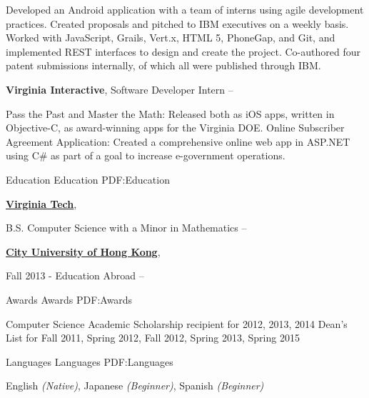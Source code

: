 \documentclass[letterpaper,MMMyyyy,nonstopmode]{simpleresumecv}
\begin{document}
\begin{Body}
\begin{large}
\Gap
\BulletItem
Developed an Android application with a team of interns using agile development practices.
\BulletItem
Created proposals and pitched to IBM executives on a weekly basis.
\BulletItem
Worked with JavaScript, Grails, Vert.x, HTML 5, PhoneGap, and Git, and implemented REST interfaces to design and create the project.
\BulletItem
Co-authored four patent submissions internally, of which all were published through IBM.
\end{large}

\BigGap
\Entry
\begin{large}
{\textbf{Virginia Interactive}},
Software Developer Intern
\hfill
{} --

\Gap
\BulletItem
Pass the Past and Master the Math: Released both as iOS apps, written in Objective-C, as award-winning apps for the Virginia DOE.
\BulletItem
Online Subscriber Agreement Application: Created a comprehensive online web app in ASP.NET using C# as part of a goal to increase e-government operations.
\end{large}


\BigGap
\Section
{Education}
{Education}
{PDF:Education}

\begin{large}
\Entry
\href{http://www.example.com/my-college}
{\textbf{Virginia Tech}},

\Gap
B.S. Computer Science with a Minor in Mathematics
\hfill
{} --

\BigGap
\Entry
\href{http://www.example.com/my-college}
{\textbf{City University of Hong Kong}},

\Gap
Fall 2013 - Education Abroad
\hfill
{} --
\end{large}


\BigGap
\Section
{Awards}
{Awards}
{PDF:Awards}

\begin{large}
Computer Science Academic Scholarship recipient for 2012, 2013, 2014
\Gap
Dean’s List for Fall 2011, Spring 2012, Fall 2012, Spring 2013, Spring 2015
\end{large}


\BigGap
\Section
{Languages}
{Languages}
{PDF:Languages}

\begin{large}
English
\textit{(Native)},
Japanese
\textit{(Beginner)},
Spanish
\textit{(Beginner)}
\end{large}

\end{Body}
\end{document}
